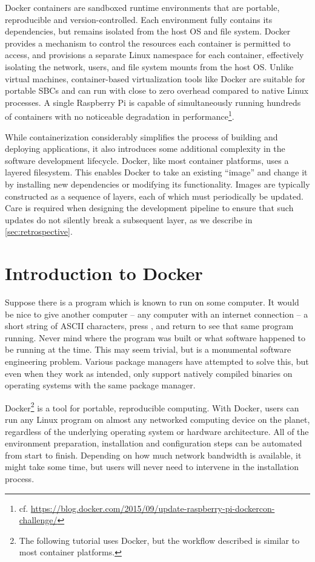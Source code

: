 \documentclass[12pt,initial,twoside,maitrise]{dms}
\numberwithin{equation}{section}
\numberwithin{table}{chapter}
\numberwithin{figure}{chapter}
\begin{document}
Docker containers are sandboxed runtime environments that are portable, reproducible and version-controlled. Each environment fully contains its dependencies, but remains isolated from the host OS and file system. Docker provides a mechanism to control the resources each container is permitted to access, and provisions a separate Linux namespace for each container, effectively isolating the network, users, and file system mounts from the host OS. Unlike virtual machines, container-based virtualization tools like Docker are suitable for portable SBCs and can run with close to zero overhead compared to native Linux processes. A single Raspberry Pi is capable of simultaneously running hundreds of containers with no noticeable degradation in performance\footnote{cf. \url{https://blog.docker.com/2015/09/update-raspberry-pi-dockercon-challenge/}}.

While containerization considerably simplifies the process of building and deploying applications, it also introduces some additional complexity in the software development lifecycle. Docker, like most container platforms, uses a layered filesystem. This enables Docker to take an existing ``image'' and change it by installing new dependencies or modifying its functionality. Images are typically constructed as a sequence of layers, each of which must periodically be updated. Care is required when designing the development pipeline to ensure that such updates do not silently break a subsequent layer, as we describe in \autoref{sec:retrospective}.

\section{Introduction to Docker}\label{sec:docker-intro}

Suppose there is a program which is known to run on some computer. It would be nice to give another computer -- any computer with an internet connection -- a short string of ASCII characters, press \keys{\return}, and return to see that same program running. Never mind where the program was built or what software happened to be running at the time. This may seem trivial, but is a monumental software engineering problem. Various package managers have attempted to solve this, but even when they work as intended, only support natively compiled binaries on operating systems with the same package manager.

Docker\footnote{The following tutorial uses Docker, but the workflow described is similar to most container platforms.} is a tool for portable, reproducible computing. With Docker, users can run any Linux program on almost any networked computing device on the planet, regardless of the underlying operating system or hardware architecture. All of the environment preparation, installation and configuration steps can be automated from start to finish. Depending on how much network bandwidth is available, it might take some time, but users will never need to intervene in the installation process.
\end{document}
